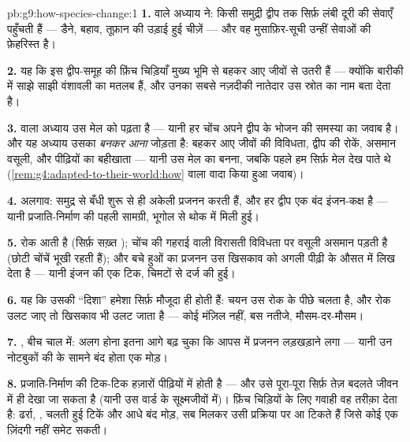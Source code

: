 \begin{solution}{pb:g9:how-species-change:1}
\textbf{1.}  वाले अध्याय ने: किसी समुद्री द्वीप तक सिर्फ़ लंबी
दूरी की सेवाएँ पहुँचती हैं --- डैने, बहाव, तूफ़ान की उड़ाई हुई चीज़ें ---
और वह मुसाफ़िर-सूची उन्हीं सेवाओं की फ़ेहरिस्त है।

\textbf{2.} यह कि इस द्वीप-समूह की फ़िंच चिड़ियाँ मुख्य भूमि से बहकर आए
जीवों से उतरी हैं --- क्योंकि बारीकी में साझे  साझी वंशावली का
मतलब हैं, और उनका सबसे नज़दीकी नातेदार उस स्रोत  का नाम बता देता है।

\textbf{3.}  वाला अध्याय उस मेल को पढ़ता है --- यानी हर चोंच अपने
द्वीप के भोजन की समस्या का जवाब है। और यह अध्याय उसका \emph{बनकर आना}
जोड़ता है: बहकर आए जीवों की विविधता, द्वीप की रोकें, असमान वसूली, और
पीढ़ियों का बहीखाता --- यानी उस मेल का बनना, जबकि पहले हम सिर्फ़ मेल देख
पाते थे (\cref{rem:g4:adapted-to-their-world:how} वाला वादा किया हुआ
जवाब)।

\textbf{4.} अलगाव: समुद्र से बँधी  शुरू से ही अकेली प्रजनन करती
हैं, और हर द्वीप एक बंद इंजन-कक्ष है --- यानी प्रजाति-निर्माण की पहली
सामग्री, भूगोल से थोक में मिली हुई।

\textbf{5.} रोक आती है (सिर्फ़ सख़्त ); चोंच की गहराई वाली विरासती
विविधता पर वसूली असमान पड़ती है (छोटी चोंचें भूखी रहती हैं); और बचे हुओं
का प्रजनन उस खिसकाव को अगली पीढ़ी के औसत में लिख देता है --- यानी इंजन की
एक टिक, चिमटों से दर्ज की हुई।

\textbf{6.} यह कि उसकी ``दिशा'' हमेशा सिर्फ़ मौजूदा  ही
होती हैं: चयन उस रोक के पीछे चलता है, और रोक उलट जाए तो खिसकाव भी उलट
जाता है --- कोई मंज़िल नहीं, बस नतीजे, मौसम-दर-मौसम।

\textbf{7.} , बीच चाल में:
अलग होना इतना आगे बढ़ चुका कि आपस में प्रजनन लड़खड़ाने लगा --- यानी उन
नोटबुकों की  के सामने बंद होता एक मोड़।

\textbf{8.} प्रजाति-निर्माण की टिक-टिक हज़ारों पीढ़ियों में होती है ---
और उसे पूरा-पूरा सिर्फ़ तेज़ बदलते जीवन में ही देखा जा सकता है (यानी उस
वार्ड के सूक्ष्मजीवों में)। फ़िंच चिड़ियों के लिए गवाही वह तरीक़ा देता
है: ढर्रा, , चलती हुई टिकें और आधे बंद मोड़, सब मिलकर उसी
प्रक्रिया पर आ टिकते हैं जिसे कोई एक ज़िंदगी नहीं समेट सकती।


\end{solution}

